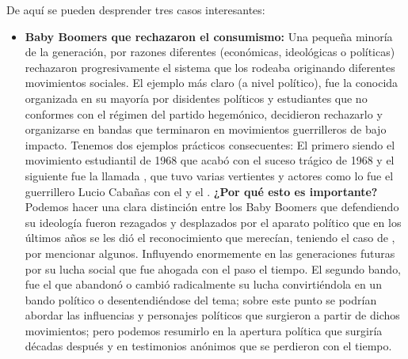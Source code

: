 De aquí se pueden desprender tres casos interesantes:
\begin{itemize}
    \item \textbf{Baby Boomers que rechazaron el consumismo:} Una pequeña minoría de la generación, por razones diferentes
            (económicas, ideológicas o políticas) rechazaron progresivamente el sistema que los rodeaba originando diferentes
            movimientos sociales. El ejemplo más claro (a nivel político), fue la conocida  organizada
            en su mayoría por disidentes políticos y estudiantes que no conformes con el régimen del partido hegemónico,
            decidieron rechazarlo y organizarse en bandas que terminaron en movimientos guerrilleros de bajo impacto. Tenemos
            dos ejemplos prácticos consecuentes: El primero siendo el movimiento estudiantil de 1968 que acabó con el suceso
            trágico de 1968 y el siguiente fue la llamada , que tuvo varias
            vertientes y actores como lo fue el guerrillero Lucio Cabañas con el  y el
            . \textbf{¿Por qué esto es importante?} Podemos hacer una clara distinción entre los
            Baby Boomers que defendiendo su ideología fueron rezagados y desplazados por el aparato político que en los últimos años
            se les dió el reconocimiento que merecían, teniendo el caso de , 
            por mencionar algunos. Influyendo enormemente en las generaciones futuras por su lucha social que fue ahogada con el
            paso el tiempo. El segundo bando, fue el que abandonó o cambió radicalmente su lucha convirtiéndola en un bando político
            o desentendiéndose del tema; sobre este punto se podrían abordar las influencias y personajes políticos que surgieron a partir
            de dichos movimientos; pero podemos resumirlo en la apertura política que surgiría décadas después y en testimonios
            anónimos que se perdieron con el tiempo.


\end{itemize}
